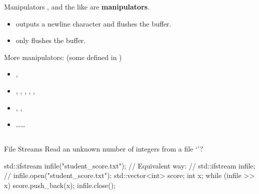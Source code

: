 \begin{frame}[fragile]{Manipulators}
    ,  and the like are \textbf{manipulators}.
    \begin{itemize}
        \item {} outputs a newline character and flushes the buffer.
        \item {} only flushes the buffer.
    \end{itemize}
    More manipulators: (some defined in )
    \begin{itemize}
        \item {}, 
        \item {}, , , , , 
        \item {}, , 
        \item \dots\dots
    \end{itemize}
\end{frame}

\subsection{}

\begin{frame}[fragile]{File Streams}
    Read an unknown number of integers from a file `'?
    \begin{cpp}
std::ifstream infile("student_score.txt");
// Equivalent way:
// std::ifstream infile;
// infile.open("student_score.txt");
std::vector<int> score;
int x;
while (infile >> x)
  score.push_back(x);
infile.close();
    \end{cpp}
\end{frame}

